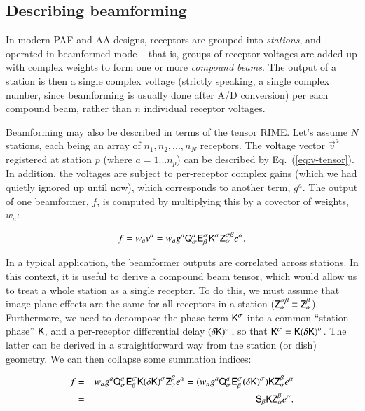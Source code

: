 \documentclass[]{aa}
\begin{document}
\subsection{Describing beamforming}

In modern PAF and AA designs, receptors are grouped into \emph{stations}, and operated in beamformed mode -- that is, groups of receptor 
voltages are added up with complex weights to form one or more \emph{compound beams}. The output of a station is then a single complex voltage 
(strictly speaking, a single complex number, since beamforming is usually done after A/D conversion) per each compound beam, rather than $n$ individual 
receptor voltages.

Beamforming may also be described in terms of the tensor RIME. Let's assume $N$ stations, each being an array of $n_{1},n_{2},...,n_{N}$
receptors. The voltage vector $\vec v^a$ registered at station $p$ (where $a=1...n_p$) can be described by Eq.~(\ref{eq:v-tensor}). In addition, the voltages are subject to per-receptor complex gains (which we had quietly ignored up until now), which corresponds to another term, $g^a$.
The output of one beamformer, $f$, is computed by multiplying this by a covector of weights, $w_{a}$:

\begin{equation}
\label{eq:beamformer-output}  
f=w_{a}v^{a}=w_a g^a \mathsf{Q}_{\sigma}^{a}\mathsf{E}_{\beta}^{\sigma}\mathsf{K}^{\sigma}\mathsf{Z}_{\alpha}^{\sigma\beta}e^{\alpha}.
\end{equation}

In a typical application, the beamformer outputs are correlated across stations. In this context, it is useful to derive a compound beam tensor,
which would allow us to treat a whole station as a single receptor. To do this, we must assume that image plane effects are the same for
all receptors in a station ($\mathsf{Z}_{\alpha}^{\sigma\beta}\equiv \mathsf{Z}_{\alpha}^{\beta}$). Furthermore, we need to decompose the 
phase term $\mathsf{K}^{\sigma}$ into a common ``station phase'' $\mathsf{K}$, and a per-receptor differential delay $(\mathsf{\delta{K)}}^{\sigma}$, so that $\mathsf{K}^{\sigma}=\mathsf{K}{(\mathsf{\delta K})}^{\sigma}$. The latter can be derived in a straightforward way from the station (or dish) geometry. We can then collapse some summation indices:

\begin{eqnarray}
\nonumber f & = &w_{a}g^a\mathsf{Q}_{\sigma}^{a}\mathsf{E}_{\beta}^{\sigma}\mathsf{K}{\mathsf{(\delta K)}}^{\sigma}\mathsf{Z}_{\alpha}^{\beta}e^{\alpha}=
(w_{a}g^a\mathsf{Q}_{\sigma}^{a}\mathsf{E}_{\beta}^{\sigma}{\mathsf{(\delta K)}}^{\sigma})\mathsf{K}\mathsf{Z}_{\alpha}^{\beta}e^{\alpha} \\
& = & \mathsf{S}_{\beta}\mathsf{K}\mathsf{Z}_{\alpha}^{\beta}e^{\alpha}.
\label{eq:compound-beam}
\end{eqnarray}
\end{document}
